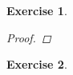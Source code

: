 \documentclass[10pt,letterpaper]{amsart}
\newcounter{enumcounter}
\newenvironment{enum}
{\begin{list}{$(\alph{enumcounter})$~}{\usecounter{enumcounter} \labelsep=0em \labelwidth=0em \leftmargin=0em \topsep=0em}}
{\end{list}}
\newtheorem{exercise}{Exercise}[section]
\theoremstyle{definition}
\theoremstyle{remark}
\numberwithin{equation}{exercise}
\begin{document}
\begin{multicols}{2}
\begin{exercise}
\begin{proof}
    \end{proof}
  \end{exercise}
  \setcounter{exercise}{9}
  \begin{exercise}\label{2.10}

\end{exercise}
\end{multicols}
\end{document}
